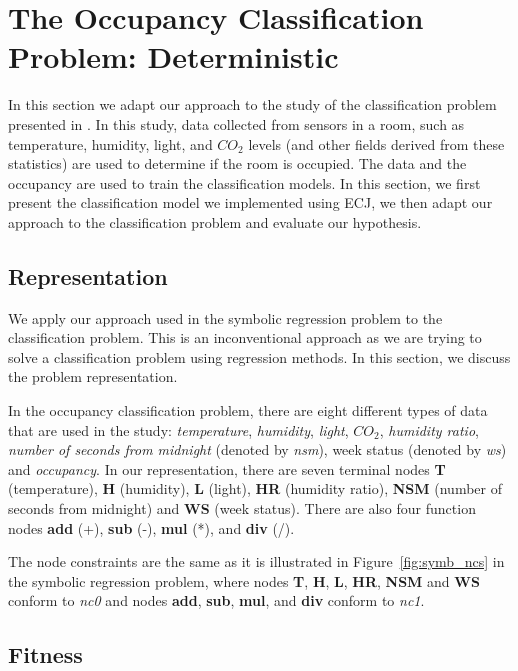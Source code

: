 \section{The Occupancy Classification Problem: Deterministic}
\label{classification_deterministic}
In this section we adapt our approach to the study of the classification problem presented in \cite{Candanedo201628}. In this study, data collected from sensors in a room, such as temperature, humidity, light, and $CO_2$ levels (and other fields derived from these statistics) are used to determine if the room is occupied. The data and the occupancy are used to train the classification models. In this section, we first present the classification model we implemented using ECJ, we then adapt our approach to the classification problem and evaluate our hypothesis.

\subsection{Representation}
We apply our approach used in the symbolic regression problem to the classification problem. This is an inconventional approach as we are trying to solve a classification problem using regression methods. In this section, we discuss the problem representation.

In the occupancy classification problem, there are eight different types of data that are used in the study: \emph{temperature}, \emph{humidity}, \emph{light}, $CO_2$, \emph{humidity ratio}, \emph{number of seconds from midnight} (denoted by \emph{nsm}), week status (denoted by \emph{ws}) and \emph{occupancy}. In our representation, there are seven terminal nodes \textbf{T} (temperature), \textbf{H} (humidity), \textbf{L} (light), \textbf{HR} (humidity ratio), \textbf{NSM} (number of seconds from midnight) and \textbf{WS} (week status). There are also four function nodes \textbf{add} (+), \textbf{sub} (-), \textbf{mul} (*), and \textbf{div} (/). 

The node constraints are the same as it is illustrated in Figure~\ref{fig:symb_ncs} in the symbolic regression problem, where nodes \textbf{T}, \textbf{H}, \textbf{L}, \textbf{HR}, \textbf{NSM} and \textbf{WS} conform to \emph{nc0} and nodes \textbf{add}, \textbf{sub}, \textbf{mul}, and \textbf{div} conform to \emph{nc1}.

\subsection{Fitness}

